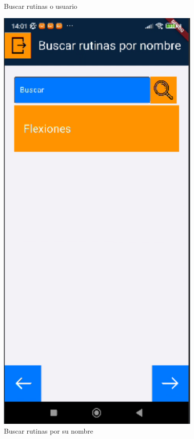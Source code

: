 \begin{figure}[H]
\begin{minipage}{0.4\textwidth}
      \caption{Buscar rutinas o usuario}
      \label{fig:buscarRutinasNomOUser}
   \end{minipage}%
   \hspace{0.5cm}
   \begin{minipage}{0.4\textwidth}
      \centering
      \includegraphics[width=0.9\textwidth]{pantallas/buscarRutina.png}
      \caption{Buscar rutinas por su nombre}
      \label{fig:buscarRutina}
   \end{minipage}
\end{figure}

